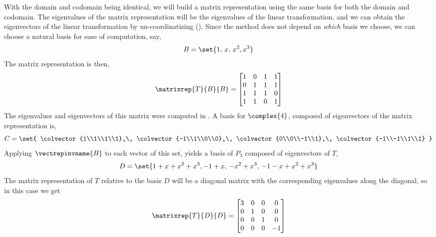 With the domain and codomain being identical, we will build a matrix representation using the same basis for both the domain and codomain.  The eigenvalues of the matrix representation will be the eigenvalues of the linear transformation, and we can obtain the eigenvectors of the linear transformation by un-coordinatizing ().  Since the method does not depend on {\em which} basis we choose, we can choose a natural basis for ease of computation, say,
%
\begin{equation*}
B=\set{1,\,x,\,x^2,x^3}
\end{equation*}
%
The matrix representation is then,
%
\begin{equation*}
\matrixrep{T}{B}{B}=
\begin{bmatrix}
1 &  0 &  1 &  1\\ 
0 &  1 &  1 &  1\\ 
1 &  1 &  1 &  0\\ 
1 &  1 &  0 &  1
\end{bmatrix}
\end{equation*}
%
The eigenvalues and eigenvectors of this matrix were computed in .  A basis for $\complex{4}$, composed of eigenvectors of the matrix representation is,
%
\begin{equation*}
C=\set{
\colvector{1\\1\\1\\1},\,
\colvector{-1\\1\\0\\0},\,
\colvector{0\\0\\-1\\1},\,
\colvector{-1\\-1\\1\\1}
}
\end{equation*}
%
Applying $\vectrepinvname{B}$ to each vector of this set, yields a basis of $P_3$ composed of eigenvectors of $T$,
%
\begin{equation*}
D=\set{1+x+x^2+x^3, -1+x,\,-x^2+x^3,\,-1-x+x^2+x^3}
\end{equation*}
%
The matrix representation of $T$ relative to the basis $D$ will be a diagonal matrix with the corresponding eigenvalues along the diagonal, so in this case we get
%
\begin{equation*}
\matrixrep{T}{D}{D}=
\begin{bmatrix}
3 & 0 & 0 & 0\\
0 & 1 & 0 & 0\\
0 & 0 & 1 & 0\\
0 & 0 & 0 & -1
\end{bmatrix}
\end{equation*}
